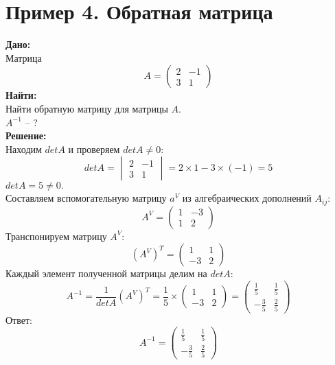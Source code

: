 \documentclass[a4paper,12pt]{article} %
\begin{document}
\section{Пример 4. Обратная матрица}
\textbf{Дано:} \\
Матрица
\begin{displaymath}
A=\begin{pmatrix}
2 & -1\\
3 & 1
\end{pmatrix}
\end{displaymath}
\textbf{Найти:}\\
Найти обратную матрицу для матрицы $A$.\\
$A^{-1}$ -- ?\\
\textbf{Решение:}\\
Находим $det A$ и проверяем $det A\ne 0$:
\begin{displaymath}
det A=\begin{vmatrix}
2 & -1\\
3 & 1
\end{vmatrix}=2\times 1-3\times(-1)=5
\end{displaymath}
$det A=5\ne 0.$\\
Составляем вспомогательную матрицу $a^V$ из алгебраических дополнений $A_{ij}$:
\begin{displaymath}
A^V=\begin{pmatrix}
1 & -3\\
1 & 2
\end{pmatrix}
\end{displaymath}
Транспонируем матрицу $A^V$:
\begin{displaymath}
(A^V)^T=\begin{pmatrix}
1 & 1\\
-3 & 2
\end{pmatrix}
\end{displaymath}
Каждый элемент полученной матрицы делим на $det A$:
\begin{displaymath}
A^{-1}=\frac{1}{detA}(A^V)^T=\frac{1}{5}\times \begin{pmatrix}
1 & 1\\
-3 & 2
\end{pmatrix}=\begin{pmatrix}
\frac{1}{5} & \frac{1}{5}\\
-\frac{3}{5} & \frac{2}{5}
\end{pmatrix}
\end{displaymath}
Ответ:\begin{displaymath}
A^{-1}=\begin{pmatrix}
\frac{1}{5} & \frac{1}{5}\\
-\frac{3}{5} & \frac{2}{5}
\end{pmatrix}
\end{displaymath}
\end{document}
